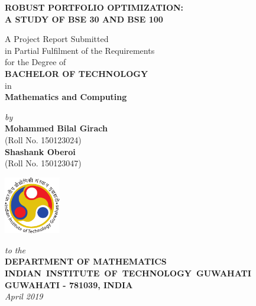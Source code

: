 \documentclass[12pt,a4paper]{report}
\theoremstyle{plain}
\theoremstyle{definition}
\theoremstyle{remark}
\begin{document}


\begin{titlepage}
\enlargethispage{3cm}

\begin{center}

\vspace*{-2cm}

\textbf{\Large ROBUST PORTFOLIO OPTIMIZATION:\\
A STUDY OF BSE 30 AND BSE 100}

\vfill

 A Project Report Submitted \\
 in Partial Fulfilment of the Requirements  \\
  for the Degree of  \\[10pt]

 {\Large \bf BACHELOR OF TECHNOLOGY}\\[5pt]
 in \\
 {\large \bf Mathematics and Computing}

 \vfill

{\large \emph{by}}\\[5pt]
{\large\bf {Mohammed Bilal Girach}}\\[5pt]
{\large (Roll No. 150123024)} \\ [5pt]
{\large\bf {Shashank Oberoi}}\\[5pt]
{\large (Roll No. 150123047)}

\vfill
\includegraphics[height=2.5cm]{iitglogo}

\vspace*{0.5cm}

{\em\large to the}\\[10pt]
{\bf\large DEPARTMENT OF MATHEMATICS} \\[5pt]
{\bf\large \mbox{INDIAN INSTITUTE OF TECHNOLOGY GUWAHATI}}\\[5pt]
{\bf\large GUWAHATI - 781039, INDIA}\\[10pt]
{\it\large April 2019}
\end{center}

\end{titlepage}
\end{document}
